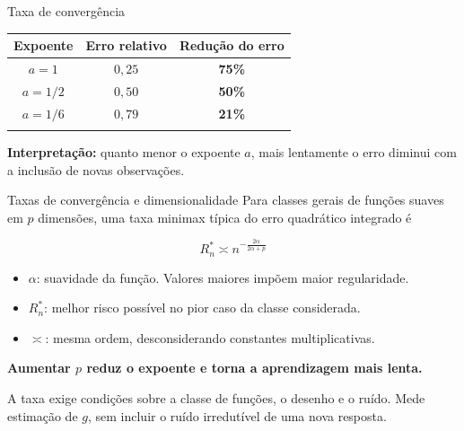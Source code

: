 \documentclass[
  10pt,
  ignorenonframetext,
  aspectratio=169,
  brazilian,
]{beamer}
\newcounter{none} %
\providecommand{\tightlist}{%
  \setlength{\itemsep}{0pt}\setlength{\parskip}{0pt}}
\begin{document}
\begin{frame}{Taxa de convergência}
\protect{}\label{taxa-de-converguxeancia-2}
{\def\LTcaptype{none} %
\begin{longtable}[]{@{}ccc@{}}
\toprule\noalign{}
Expoente & Erro relativo & Redução do erro \\
\midrule\noalign{}
\endhead
\(a=1\) & \(0{,}25\) & \textbf{75\%} \\
\(a=1/2\) & \(0{,}50\) & \textbf{50\%} \\
\(a=1/6\) & \(0{,}79\) & \textbf{21\%} \\
\bottomrule\noalign{}
\end{longtable}
}

\textbf{Interpretação:} quanto menor o expoente \(a\), mais lentamente o
erro diminui com a inclusão de novas observações.
\end{frame}

\begin{frame}{Taxas de convergência e dimensionalidade}
\protect{}\label{taxas-de-converguxeancia-e-dimensionalidade}
Para classes gerais de funções suaves em \(p\) dimensões, uma taxa
minimax típica do erro quadrático integrado é

\[
\boxed{R_n^*\asymp n^{-\frac{2\alpha}{2\alpha+p}}}
\]

\begin{itemize}
\tightlist
\item
  \(\alpha\): suavidade da função. Valores maiores impõem maior
  regularidade.
\item
  \(R_n^*\): melhor risco possível no pior caso da classe considerada.
\item
  \(\asymp\): mesma ordem, desconsiderando constantes multiplicativas.
\end{itemize}

\textbf{Aumentar \(p\) reduz o expoente e torna a aprendizagem mais
lenta.}

A taxa exige condições sobre a classe de funções, o desenho e o ruído.
Mede estimação de \(g\), sem incluir o ruído irredutível de uma nova
resposta.

\end{frame}
\end{document}
